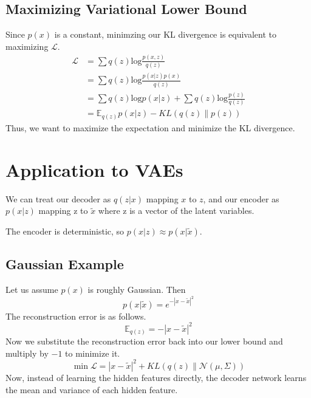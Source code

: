 \documentclass{article}
\begin{document}
\subsection{Maximizing Variational Lower Bound}
Since $p(x)$ is a constant, minimzing our KL divergence is equivalent to maximizing $\mathcal{L}$.
\begin{equation}\label{L}
\begin{aligned}
    \mathcal{L} &= \sum q(z) \text{log}\frac{p(x,z)}{q(z)}\\
    &= \sum q(z) \text{log}\frac{p(x|z)p(x)}{q(z)}\\
    &= \sum q(z)\text{log} p(x|z) + \sum q(z) \text{log}\frac{p(z)}{q(z)}\\
    &= \mathbb{E}_{q(z)}p(x|z) -KL(q(z)\parallel p(z))
\end{aligned}
\end{equation}
Thus, we want to maximize the expectation and minimize the KL divergence.

\section{Application to VAEs}
We can treat our decoder as $q(z|x)$ mapping $x$ to $z$, and our encoder as $p(x|z)$ mapping z to $\tilde{x}$ where z is a vector of the latent variables.\\
\begin{center}
\end{center}
The encoder is deterministic, so $p(x|z) \approx p(x|\tilde{x})$.
\subsection{Gaussian Example}
Let us assume $p(x)$ is roughly Gaussian. Then
\begin{equation*}
    p(x|\tilde{x}) = e^{-|x-\tilde{x}|^2}
\end{equation*}
The reconstruction error is as follows.
\begin{equation*}
    \mathbb{E}_{q(z)} = -|x-\tilde{x}|^2
\end{equation*}
Now we substitute the reconstruction error back into our lower bound and multiply by $-1$ to minimize it.
\begin{equation*}
    \min \mathcal{L} = |x-\tilde{x}|^2 + KL(q(z)\parallel \mathcal{N}(\mu,\Sigma))
\end{equation*}
Now, instead of learning the hidden features directly, the decoder network learns the mean and variance of each hidden feature.
\end{document}
